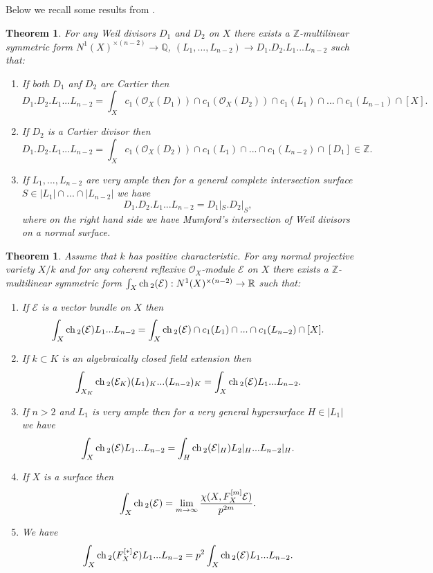 \documentclass[12pt]{article}
\theoremstyle{plain}
\newtheorem{Theorem}[Thm]{\sc Theorem}
\theoremstyle{definition}
\theoremstyle{remark}
\newcommand{\ZZ}{{\mathbb Z}}
\newcommand{\QQ}{{\mathbb Q}}
\newcommand{\RR}{{\mathbb R}}
\newcommand{\cE}{{\mathcal E}}
\newcommand{\cO}{{\mathcal O}}
\newcommand{\ch}{{\mathop{\rm ch \, }}}
\begin{document}
\medskip

Below we recall some results from \cite{La-Chern}.


\begin{Theorem}\label{main1}
	For any Weil divisors $D_1$ and $D_2$ on $X$ there exists a $\ZZ$-multilinear symmetric form $N^1(X)^{\times (n-2)}\to \QQ$, $(L_1,... ,L_{n-2})\to D_1.D_2.L_1...L_{n-2}$ such that:
	\begin{enumerate}	
		\item If both $D_1$ anf $D_2$ are Cartier then  
		$$ D_1.D_2.L_1...L_{n-2}= \int_Xc_1(\cO_X (D_1))\cap c_1(\cO_X(D_2))\cap c_1(L_1)\cap ...\cap c_1(L_{n-1})\cap  [X].$$
		\item If $D_2$ is a Cartier divisor then  
		$$ D_1.D_2.L_1...L_{n-2}= \int_X c_1(\cO_X (D_2))\cap c_1(L_1)\cap ...\cap c_1(L_{n-2})\cap  [D_1]\in \ZZ.$$
		\item If $L_1,...,L_{n-2}$ are very ample
		then   for a general complete intersection surface  $S\in |L_1|\cap ...\cap |L_{n-2}|$ we have 
		$$D_1.D_2.L_1...L_{n-2} =D_1|_S.D_2|_S,$$
		where on the right hand side  we have Mumford's intersection of Weil divisors on a normal surface.
	\end{enumerate}
\end{Theorem}



\begin{Theorem}\label{properties-of-ch_2}
	Assume that $k$ has positive characteristic. For any normal projective variety $X/k$ and for any 
	coherent reflexive $\cO_X$-module $\cE$ on $X$ there exists a $\ZZ$-multilinear symmetric 
	form $\int _X \ch _2 (\cE): N^1(X) ^{\times (n-2)}\to \RR$ such that:
	\begin{enumerate}
		\item If $\cE$ is a vector bundle on $X$ then $$\int _X \ch _2 (\cE)L_1...L_{n-2}=\int_X \ch _2 (\cE)\cap c_1(L_1)\cap ...\cap c_1(L_{n-2})\cap[X].$$
	    \item If $k\subset K$ is an algebraically closed field extension then 
	    $$\int _{X_K} \ch _2 (\cE_K)(L_1)_K...(L_{n-2})_K=\int _X \ch _2 (\cE)L_1...L_{n-2}.$$
	    \item If $n>2$ and  $ L_1$ is very ample then for a very general hypersurface $H\in |L_1|$ we have
		$$\int _X \ch_2 (\cE)L_1...L_{n-2}=\int _{H}\ch_2 (\cE|_{H})L_2|_{H}...L_{n-2}|_{H}.$$
		\item If $X$ is a surface then
		$$\int _X \ch _2 (\cE)= \lim _{m\to \infty }\frac {  \chi (X,  F_X^{[m]}\cE  ) }{p^{2m}}.$$
		\item We have
		$$\int _X \ch _2 (F_X^{[*]}\cE)L_1...L_{n-2}=p^2\int _X \ch _2 (\cE)L_1...L_{n-2}.$$
	\end{enumerate}
\end{Theorem}
\end{document}
